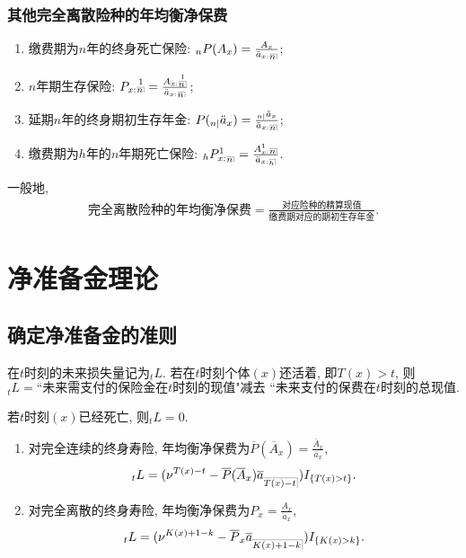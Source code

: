 \documentclass[lang=cn,10pt]{elegantbook}
\makeatletter
\DeclareRobustCommand{\annu}[1]{_{%
    \def\arraystretch{0}%
    \setlength\arraycolsep{1pt}%
    \setlength\arrayrulewidth{.2pt}%
    \begin{array}[b]{@{}c|}\hline
        \\[\arraycolsep]%
        \scriptstyle #1%
    \end{array}%
}}
\makeatother
\begin{document}
\subsection{其他完全离散险种的年均衡净保费}
\begin{proposition}
    \begin{enumerate}
        \item 缴费期为$n$年的终身死亡保险: ${}_{n}P(A_{x})=\frac{A_{x}}{\ddot{a}_{x:}{}\annu n}$;
        \item $n$年期生存保险: $P_{x:}\overset{1}{{}\annu n}=\frac{A_{x:}\overset{1}{{}\annu n}}{\ddot a_{x:}{}\annu n}$; 
        \item 延期$n$年的终身期初生存年金: $P({}_{n|}\ddot a_{x})=\frac{{}_{n|}\ddot a_{x}}{\ddot{a}_{x:}{}\annu n}$;
        \item 缴费期为$h$年的$n$年期死亡保险: ${}_{h}P^{1}_{x:}{}_{\annu n}=\frac{A^{1}_{x:}{}\annu n}{\ddot a_{x:}{}{\scriptsize \annu h}}$.
    \end{enumerate}
\end{proposition}

\begin{remark}
    一般地,
    \begin{align*}
  \text{完全离散险种的年均衡净保费}=\frac{\text{对应险种的精算现值}}{\text{缴费期对应的期初生存年金}}.
  \end{align*}
  \end{remark}

\chapter{净准备金理论}
\section{确定净准备金的准则}
\begin{definition}[未来损失量]
    在$t$时刻的未来损失量记为$_tL$. 若在$t$时刻个体$(x)$还活着, 即$T(x)>t$, 则$${}_tL=\text{``未来需支付的保险金在$t$时刻的现值"减去 ``未来支付的保费在}t\text{时刻的总现值.}$$

若$t$时刻$(x)$已经死亡, 则${}_tL=0.$

\begin{enumerate}
    \item 对完全连续的终身寿险, 年均衡净保费为$\overline{P}( \overline{A}_x )=\frac{\overline A_x}{\overline a_x},$
    $${}_tL=(\nu^{T(x)-t}-\overline{P}( \overline{A}_x )\overline a_{\annu {T(x)-t}})I_{\{T(x)>t\}}.$$
    \item 对完全离散的终身寿险, 年均衡净保费为$P_x=\frac{A_x}{\ddot{a}_x},$
    $${}_tL=(\nu^{K(x)+1-k}-\overline{P}_x \overline a_{\annu {K(x)+1-k}})I_{\{K(x)>k\}}.$$
\end{enumerate}
\end{definition}
\end{document}
